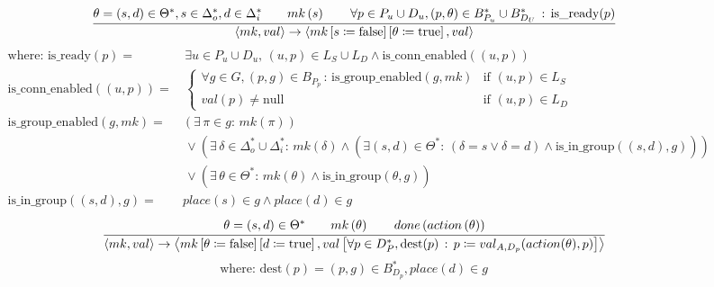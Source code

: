 {%
\begin{figure}[tp]
%
\begin{equation}
\cfrac{\theta =\left(s,d\right) \in \Theta^*,s \in \Delta_o^*,d \in \Delta_i^*\qquad mk\left(s\right)\qquad\forall p \in P_{u}\cup D_{u},\left(p,\theta\right)\in B_{P_{u}}^{*}\cup B_{D_{U}}^{*}\,:\,\text{is\_ready}(p)}{\left\langle mk,val\right\rangle \rightarrow\left\langle mk\left[s\coloneqq\text{false}\right]\left[\theta\coloneqq\text{true}\right],val\right\rangle }
\label{eq:r1}
\end{equation}
%
\begin{align*}
  \text{where: }\text{is\_ready}(p) = &\, \exists u\in P_u\cup D_u,\,(u,p)\in L_{S}\cup L_{D}\land \text{is\_conn\_enabled}\left((u,p)\right) \\
  \text{is\_conn\_enabled}\left((u,p)\right) = &\, \begin{cases}
\forall g\in G,\left(p,g\right)\in B_{P_{p}}\,:\,\text{is\_group\_enabled}\left(g,mk\right) & \text{if }\left(u,p\right)\in L_{S}\\
val\left(p\right)\neq\text{null} & \text{if }\left(u,p\right)\in L_{D}
\end{cases} \\
\text{is\_group\_enabled}\left(g,mk\right) = & \left(\exists\,\pi\in g:\,mk\left(\pi\right)\right)\\
 & \, \lor\left(\exists\,\delta\in\Delta_{o}^{*}\cup\Delta_{i}^{*}:\,mk\left(\delta\right)\land \left(\exists(s,d)\in\Theta^{*}:\,\left(\delta=s\lor \delta=d\right)\land \text{is\_in\_group}\left((s,d),g\right)\right)\right)\\
 & \, \lor\left(\exists\,\theta\in\Theta^{*}:\,mk\left(\theta\right)\land \text{is\_in\_group}\left(\theta,g\right)\right) \\
\text{is\_in\_group}\left((s,d),g\right) = & place\left(s\right)\in g\land place\left(d\right)\in g
\end{align*}
%
\begin{equation}
\cfrac{\theta=\left(s,d\right) \in \Theta^*\qquad mk\left(\theta\right)\qquad done\left(action\left(\theta\right)\right)}{\left\langle mk,val\right\rangle \rightarrow\left\langle mk\left[\theta\coloneqq\text{false}\right]\left[d\coloneqq\text{true}\right],val\left[\forall p\in D_P^*,\text{dest}(p)\,:\, p\coloneqq val_{A,D_p}(action(\theta),p)\right]\right\rangle}
\label{eq:r2}
\end{equation}
%
\begin{equation*}
  \text{where: }\text{dest}(p) = \left(p,g\right)\in B_{D_{p}}^*,place(d)\in g

\end{equation*}
\end{figure}}
